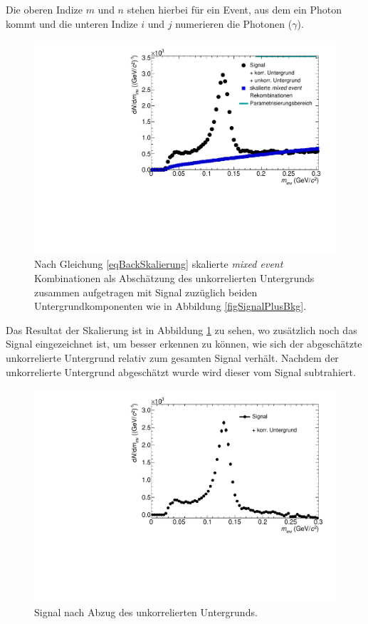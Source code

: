 Die oberen Indize $m$ und $n$ stehen hierbei für ein Event, aus dem ein Photon kommt und die unteren Indize $i$ und $j$ numerieren die Photonen ($\gamma$).
\begin{figure}[tp]
\centering
\includegraphics[width=.75\linewidth]{hUncorrBkgNorm.pdf}
\caption{Nach Gleichung \ref{eqBackSkalierung} skalierte {\it mixed event} Kombinationen als Abschätzung des unkorrelierten Untergrunds zusammen aufgetragen mit Signal zuzüglich beiden Untergrundkomponenten wie in Abbildung \ref{figSignalPlusBkg}.}
\label{figUncorrBkgNorm}
\end{figure}
\newline
Das Resultat der Skalierung ist in Abbildung \ref{figUncorrBkgNorm} zu sehen, wo zusätzlich noch das Signal eingezeichnet ist, um besser erkennen zu können, wie sich der abgeschätzte unkorrelierte Untergrund relativ zum gesamten Signal verhält.
Nachdem der unkorrelierte Untergrund abgeschätzt wurde wird dieser vom Signal subtrahiert.
\begin{figure}[tp]
\centering
\includegraphics[width=.75\linewidth]{hInvMass_Data.pdf}
\caption{Signal nach Abzug des unkorrelierten Untergrunds.}
\label{figInvMass_Data}
\end{figure}
